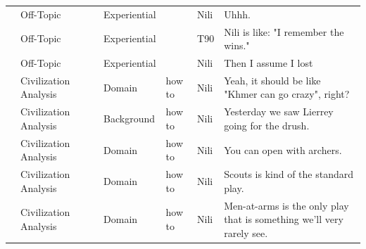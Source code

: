 {\begin{longtable}{@{}>{\theAppRow}r|L{2.3cm}L{2.2cm}L{1.4cm}L{2.2cm}L{0.5cm}U{5.6cm}@{}}
    & Off-Topic             &                      & Experiential &                   & Nili    & Uhhh.                                                                                                                                                                                                                    \\
    & Off-Topic             &                      & Experiential &                   & T90     & Nili is like: "I remember the wins."                                                                                                                                                                                     \\
    & Off-Topic             &                      & Experiential &                   & Nili    & Then I assume I lost                                                                                                                                                                                                     \\
    & Civilization Analysis &                      & Domain      & how to            & Nili    & Yeah, it should be like "Khmer can go crazy", right?                                                                                                                                                                     \\
    & Civilization Analysis &                      & Background  & how to            & Nili    & Yesterday we saw Lierrey going for the drush.                                                                                                                                                                            \\
    & Civilization Analysis &                      & Domain      & how to            & Nili    & You can open with archers.                                                                                                                                                                                               \\
    & Civilization Analysis &                      & Domain      & how to            & Nili    & Scouts is kind of the standard play.                                                                                                                                                                                     \\
    & Civilization Analysis &                      & Domain      & how to            & Nili    & Men-at-arms is the only play that is something we'll very rarely see.                                                                                                                                                    \\

\end{longtable}}
